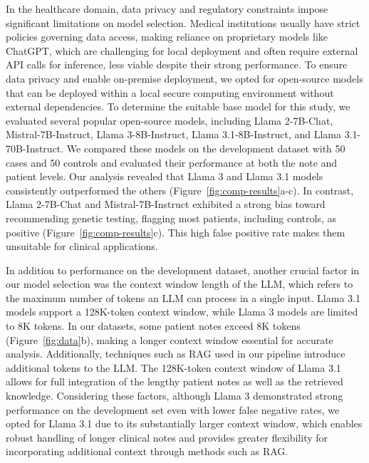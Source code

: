 \documentclass[fleqn,10pt]{wlscirep}
\begin{document}
In the healthcare domain, data privacy and regulatory constraints impose significant limitations on model selection. Medical institutions usually have strict policies governing data access, making reliance on proprietary models like ChatGPT, which are challenging for local deployment and often require external API calls for inference, less viable despite their strong performance. To ensure data privacy and enable on-premise deployment, we opted for open-source models that can be deployed within a local secure computing environment without external dependencies. To determine the suitable base model for this study, we evaluated several popular open-source models, including Llama 2-7B-Chat,\cite{touvron2023llama} Mistral-7B-Instruct,\cite{Jiang2023Mistral7} Llama 3-8B-Instruct, Llama 3.1-8B-Instruct, and Llama 3.1-70B-Instruct.\cite{grattafiori2024llama} We compared these models on the development dataset with 50 cases and 50 controls and evaluated their performance at both the note and patient levels. Our analysis revealed that Llama 3 and Llama 3.1 models consistently outperformed the others (Figure~\ref{fig:comp-results}a-c). In contrast, Llama 2-7B-Chat and Mistral-7B-Instruct exhibited a strong bias toward recommending genetic testing, flagging most patients, including controls, as positive (Figure~\ref{fig:comp-results}c). This high false positive rate makes them unsuitable for clinical applications.

In addition to performance on the development dataset, another crucial factor in our model selection was the context window length of the LLM, which refers to the maximum number of tokens an LLM can process in a single input. Llama 3.1 models support a 128K-token context window, while Llama 3 models are limited to 8K tokens. In our datasets, some patient notes exceed 8K tokens (Figure~\ref{fig:data}b), making a longer context window essential for accurate analysis. Additionally, techniques such as RAG used in our pipeline introduce additional tokens to the LLM. The 128K-token context window of Llama 3.1 allows for full integration of the lengthy patient notes as well as the retrieved knowledge. Considering these factors, although Llama 3 demonstrated strong performance on the development set even with lower false negative rates, we opted for Llama 3.1 due to its substantially larger context window, which enables robust handling of longer clinical notes and provides greater flexibility for incorporating additional context through methods such as RAG.
\end{document}
